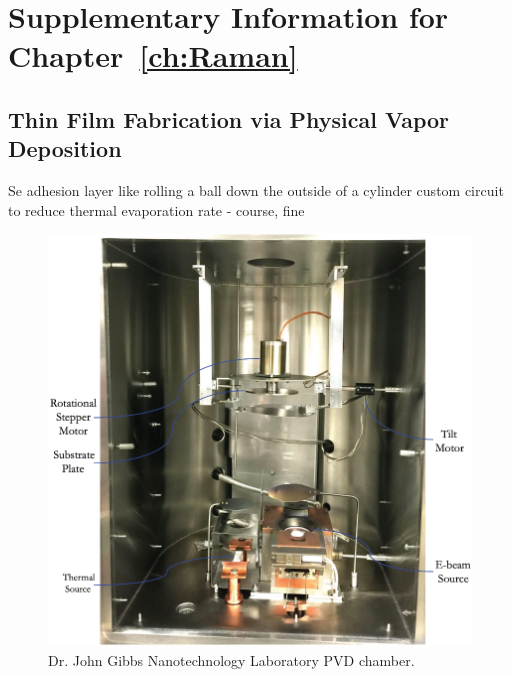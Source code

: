 \chapter{Supplementary Information for Chapter~\ref{ch:Raman}}
\label{appendix: Raman}
\acresetall

\section{Thin Film Fabrication via Physical Vapor Deposition}
\label{Raman:Appendix:sec:ThinFilmFabricationViaPVD}

Se adhesion layer
like rolling a ball down the outside of a cylinder
custom circuit to reduce thermal evaporation rate - course, fine

\begin{figure}[t]
  \centering
  \includegraphics[width=\textwidth]{figs/4-Raman/DepositionChamber.png}
  \caption{Dr. John Gibbs Nanotechnology Laboratory \ac{PVD} chamber.}
  \label{fig:Raman:DepositionChamber}
\end{figure}

